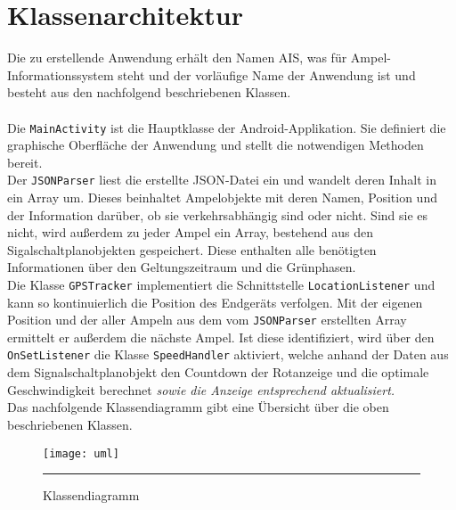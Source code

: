 \section{Klassenarchitektur}
Die zu erstellende Anwendung erhält den Namen AIS, was für Ampel-Informationssystem steht und der vorläufige Name der Anwendung ist und besteht aus den nachfolgend beschriebenen Klassen. \\\\
Die \texttt{MainActivity} ist die Hauptklasse der Android-Applikation. Sie definiert die graphische Oberfläche der Anwendung und stellt die notwendigen Methoden bereit. \\
Der \texttt{\gls{JSON}Parser} liest die erstellte \gls{JSON}-Datei ein und wandelt deren Inhalt in ein Array um. Dieses beinhaltet Ampelobjekte mit deren Namen, Position und der Information darüber, ob sie verkehrsabhängig sind oder nicht. Sind sie es nicht, wird außerdem zu jeder Ampel ein Array, bestehend aus den Sigalschaltplanobjekten gespeichert. Diese enthalten alle benötigten Informationen über den Geltungszeitraum und die Grünphasen.\\ 
Die Klasse \texttt{GPSTracker} implementiert die Schnittstelle \texttt{LocationListener} und kann so kontinuierlich die Position des Endgeräts verfolgen. Mit der eigenen Position und der aller Ampeln aus dem vom \texttt{JSONParser} erstellten Array ermittelt er außerdem die nächste Ampel. Ist diese identifiziert, wird über den \texttt{OnSetListener} die Klasse \texttt{SpeedHandler} aktiviert, welche anhand der Daten aus dem Signalschaltplanobjekt den Countdown der Rotanzeige und die optimale Geschwindigkeit berechnet \textit{sowie die Anzeige entsprechend aktualisiert.} \\
Das nachfolgende Klassendiagramm gibt eine Übersicht über die oben beschriebenen Klassen.
\begin{figure}[H]  
    \centering  
    \texttt{[image: uml]} 
    \rule{35em}{0.5pt}
    \caption{Klassendiagramm}
    \label{fig:uml}
\end{figure}
